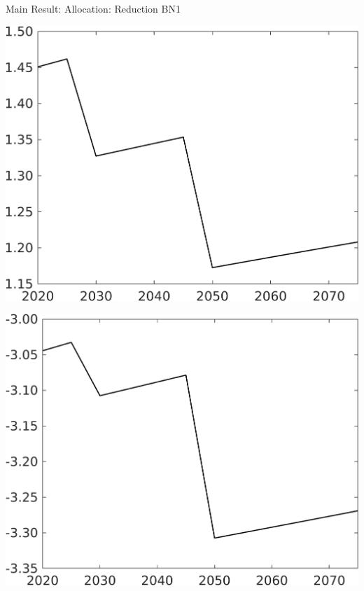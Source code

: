 \documentclass[11pt,aspectratio=169]{beamer}
\begin{document}
\begin{frame}{Main Result: Allocation: Reduction BN1}
\begin{minipage}[]{0.32\textwidth}
	\end{minipage}
	\begin{minipage}[]{0.32\textwidth}
		\includegraphics[width=1\textwidth]{../codding_model/own_basedOnFried/optimalPol_elastS_DisuSci/figures/all_1705/Single_OPT_T_NoTaus_Y_spillover0_sep1_BN1_ineq0_red0_etaa0.79.png}
	\end{minipage}
	\begin{minipage}[]{0.32\textwidth}
		\includegraphics[width=1\textwidth]{../codding_model/own_basedOnFried/optimalPol_elastS_DisuSci/figures/all_1705/Single_OPT_T_NoTaus_SWF_spillover0_sep1_BN1_ineq0_red0_etaa0.79.png}

\end{minipage}
\end{frame}
\end{document}

